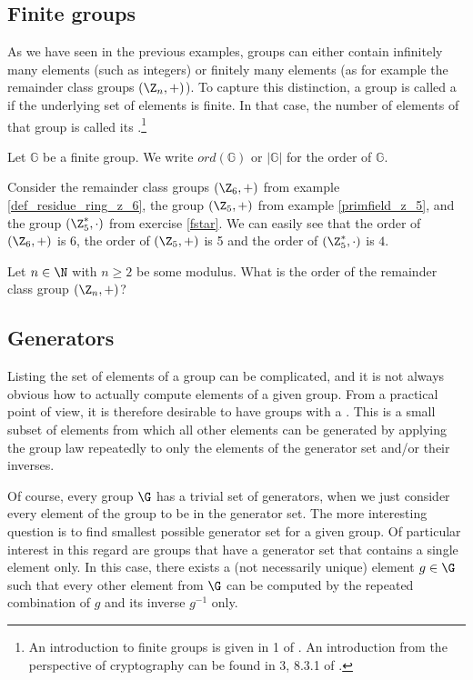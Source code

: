 \subsection{Finite groups}
\label{sec:finite-groups}
 As we have seen in the previous examples, groups can either contain infinitely many elements (such as integers) or finitely many elements (as for example the remainder class groups $(\Z_n,+)$). To capture this distinction, a group is called a  if the underlying set of elements is finite. In that case, the number of elements of that group is called its .\footnote{An introduction to finite groups is given in \chaptname{} 1 of \cite{fuchs-2015}. An introduction from the perspective of cryptography can be found in \chaptname{} 3, \secname{} 8.3.1 of \cite{katz-2007}.}
\begin{notation}
Let $\mathbb{G}$ be a finite group. We write $ord(\mathbb{G})$ or  $|\mathbb{G}|$ for the order of $\mathbb{G}$.
\end{notation}
\begin{example}\label{example:Zn}
Consider the remainder class groups $(\Z_6,+)$ from example \ref{def_residue_ring_z_6}, the group $(\Z_5,+)$ from example \ref{primfield_z_5}, and the group $(\Z_5^*,\cdot)$ from exercise \ref{fstar}. We can easily see that the order of $(\Z_6,+)$ is $6$, the order of $(\Z_5,+)$ is 5 and the order of $(\Z_5^*,\cdot)$ is $4$.
\end{example}
\begin{exercise}
\label{ex:Zn} Let $n\in\N$ with $n\geq 2$ be some modulus. What is the order of the remainder class group $(\Z_n,+)$?
\end{exercise}
\subsection{Generators}\label{generators} Listing the set of elements of a group can be {complicated}, and it is not always obvious how to actually compute elements of a given group. From a practical point of view, it is therefore desirable to have groups with a . This is a small subset of elements from which all other elements can be generated by applying the group law repeatedly to only the elements of the generator set and/or their inverses. 

Of course, every group $\G$ has a trivial set of generators, when we just consider every element of the group to be in the generator set. The more interesting question is to find smallest possible generator set for a given group. Of particular interest in this regard are groups that have a generator set that contains a single element only. In this case, there exists a (not necessarily unique) element $g\in\G$ such that every other element from $\G$ can be computed by the repeated combination of $g$ and its inverse $g^{-1}$ only. 

